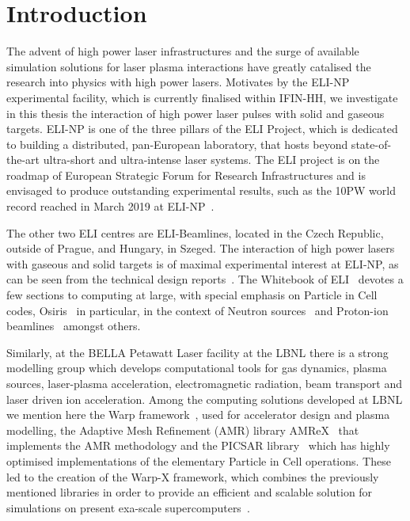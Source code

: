 \documentclass[12pt, class=report, crop=false]{standalone}
\begin{document}
\chapter{Introduction}%
\label{chap:intro}

The advent of high power laser infrastructures and the surge of available
simulation solutions for laser plasma interactions have greatly catalised
the research into physics with high power lasers. Motivates by the
ELI-NP experimental facility, which is currently finalised within
IFIN-HH, we investigate in this thesis the interaction of high power
laser pulses with solid and gaseous targets.
ELI-NP is one of the three pillars of the ELI Project, which is dedicated to
building a distributed, pan-European laboratory, that hosts beyond state-of-the-art
ultra-short and ultra-intense laser systems. The ELI project is on the roadmap
of European Strategic Forum for Research Infrastructures and is envisaged to produce
outstanding experimental results, such as the 10PW world record reached in March 2019
at ELI-NP~\autocite{eli-npteam_pressrelease_2019}.

The other two ELI centres are ELI-Beamlines, located in the Czech Republic, outside of Prague,
and Hungary, in Szeged.
The interaction of high power lasers with gaseous and solid targets is
of maximal experimental interest at ELI-NP, as can be seen from the
technical design reports~\autocite{gales_introduction_2016}.
The Whitebook of ELI~\autocite{mourou_eliextreme_2011} devotes a few sections
to computing at large, with special emphasis on Particle in Cell codes,
Osiris~\autocite{fonseca_osiristhreedimensional_2002} in particular,
in the context of Neutron sources~\autocite[79]{mourou_eliextreme_2011} and Proton-ion beamlines~\autocite[323]{mourou_eliextreme_2011} amongst others.

Similarly, at the BELLA Petawatt Laser facility at the LBNL there is a strong
modelling group which develops computational tools for gas dynamics, plasma sources,
laser-plasma acceleration, electromagnetic radiation, beam transport and
laser driven ion acceleration. Among the computing solutions developed at LBNL
we mention here the Warp framework~\autocite{grote_warpcode_2005}, used for
accelerator design and plasma modelling, the Adaptive Mesh Refinement (AMR) library
AMReX~\autocite{zhang_amrexframework_2019} that implements the AMR methodology
and the PICSAR library~\autocite{vincenti_efficientportable_2017} which has
highly optimised implementations of the elementary Particle in Cell operations.
These led to the creation of the Warp-X framework, which combines the previously
mentioned libraries in order to provide an efficient and scalable solution for
simulations on present exa-scale supercomputers~\autocite{vay_warpxnew_2018}.
\end{document}
